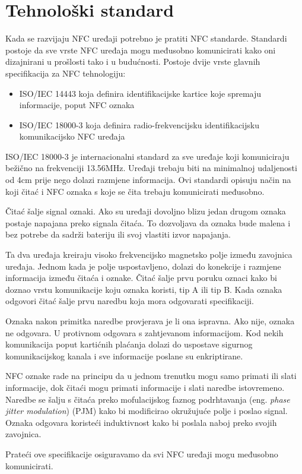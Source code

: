 \documentclass[times, utf8, zavrsni]{fer}
\begin{document}
\section{Tehnološki standard}
Kada se razvijaju NFC uređaji potrebno je pratiti NFC standarde. Standardi postoje da sve vrste NFC uređaja mogu međusobno komunicirati kako oni dizajnirani u prošlosti tako i u budućnosti. Postoje dvije vrste glavnih specifikacija za NFC tehnologiju:
\begin{itemize}
\item ISO/IEC 14443 koja definira identifikacijske kartice koje spremaju informacije, poput NFC oznaka
\item ISO/IEC 18000-3 koja definira radio-frekvencijsku identifikacijsku komunikacijsko NFC uređaja
\end{itemize}\par 
ISO/IEC 18000-3 je internacionalni standard za sve uređaje koji komuniciraju bežično na frekvenciji 13.56MHz. Uređaji trebaju biti na minimalnoj udaljenosti od 4cm prije nego dolazi razmjene informacija. Ovi standardi opisuju način na koji čitać i NFC oznaka s koje se čita trebaju komunicirati međusobno.\par
Čitać šalje signal oznaki. Ako su uređaji dovoljno blizu jedan drugom oznaka postaje napajana preko signala čitaća. To dozvoljava da oznaka bude malena i bez potrebe da sadrži bateriju ili svoj vlastiti izvor napajanja.\par
Ta dva uređaja kreiraju visoko frekvencijsko magnetsko polje između zavojnica uređaja. Jednom kada je polje uspostavljeno, dolazi do konekcije i  
razmjene informacija između čitaća i oznake. Čitać šalje prvu poruku oznaci kako bi doznao vrstu komunikacije koju oznaka koristi, tip A ili tip B. Kada oznaka odgovori čitać šalje prvu naredbu koja mora odgovarati specifikaciji.\par 
Oznaka nakon primitka naredbe provjerava je li ona ispravna. Ako nije, oznaka ne odgovara. U protivnom odgovara s zahtjevanom informacijom. Kod  nekih komunikacija poput kartićnih plaćanja dolazi do uspostave sigurnog komunikacijskog kanala i sve informacije poslane su enkriptirane.\par 
NFC oznake rade na principu da u jednom trenutku mogu samo primati ili slati informacije, dok čitaći mogu primati informacije i slati naredbe istovremeno. Naredbe se šalju s čitaća preko mofulacijskog faznog podrhtavanja (eng. \textit{phase jitter modulation}) (PJM) kako bi modificirao okružujuće polje i poslao signal. Oznaka odgovara koristeći induktivnost kako bi poslala naboj preko svojih zavojnica.\par 
Prateći ove specifikacije osiguravamo da svi NFC uređaji mogu međusobno komunicirati.
\end{document}
